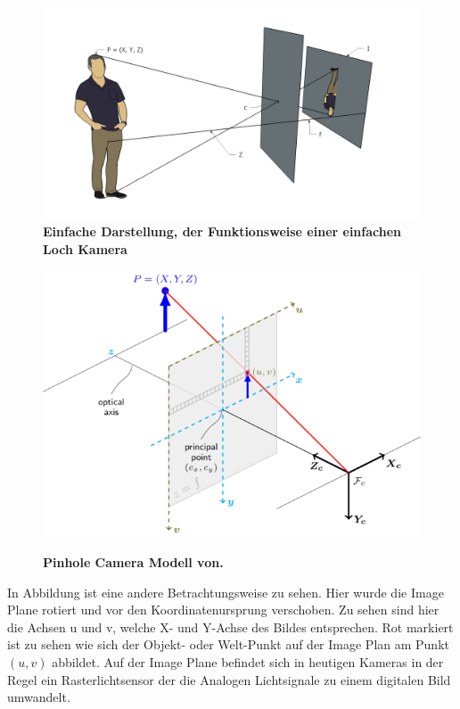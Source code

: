 \begin{figure}
\includegraphics[width=\textwidth]{media/simple-pinhole.png}\\
\caption{\textbf{Einfache Darstellung, der Funktionsweise einer einfachen Loch Kamera}
}
\label{Fig:simple-pinhole}
\includegraphics[width=\textwidth]{media/pinhole_camera_model}\\
\caption{\textbf{Pinhole Camera Modell von.\autocite{OpencvCamera2016}}
}
\label{Fig:pinhole}
\end{figure}

In Abbildung  ist eine andere Betrachtungsweise zu sehen. Hier wurde die Image Plane rotiert und vor den Koordinatenursprung verschoben. Zu sehen sind hier die Achsen u und v, welche X- und Y-Achse des Bildes entsprechen. Rot markiert ist zu sehen wie sich der Objekt- oder Welt-Punkt auf der Image Plan am Punkt $(u, v)$ abbildet. Auf der Image Plane befindet sich in heutigen Kameras in der Regel ein Rasterlichtsensor der die Analogen Lichtsignale zu einem digitalen Bild umwandelt. 

